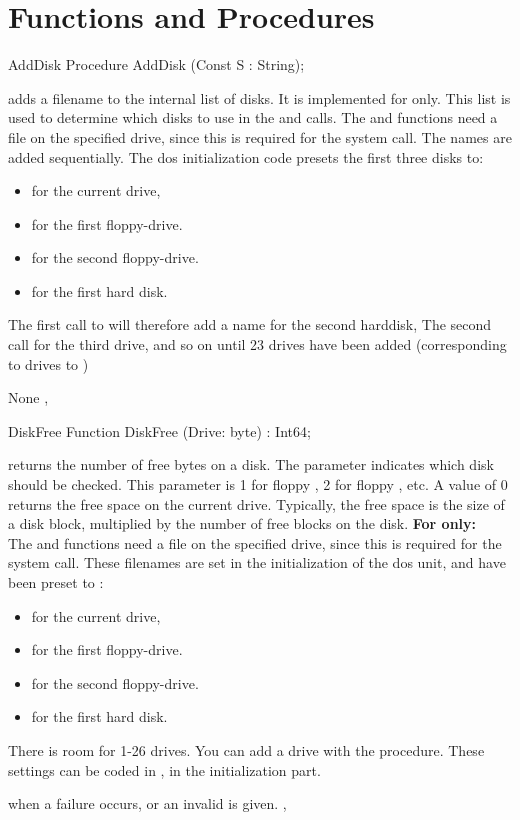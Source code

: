 \section{Functions and Procedures}
\begin{procedure}{AddDisk}
\Declaration
Procedure AddDisk (Const S : String);

\Description
{} adds a filename  to the internal list of disks. It is
implemented for \linux only.
 This list is used to determine which disks to use in the 
and  calls. 
The  and  functions need a file on the 
specified drive, since this is required for the  system call.
The names are added sequentially. The dos
initialization code presets the first three disks to:
\begin{itemize}
\item {} for the current drive, 
\item {} for the first floppy-drive.
\item {} for the second floppy-drive.
\item {} for the first hard disk.
\end{itemize}
The first call to  will therefore add a name for the second
harddisk, The second call for the third drive, and so on until 23 drives
have been added (corresponding to drives  to )

\Errors
None
\SeeAlso
{},  
\end{procedure}
\begin{function}{DiskFree}
\Declaration
Function DiskFree (Drive: byte) : Int64;

\Description

 returns the number of free bytes on a disk. The parameter
 indicates which disk should be checked. This parameter is 1 for
floppy , 2 for floppy , etc. A value of 0 returns the free
space on the current drive. 
Typically, the free space is the size of a disk block, multiplied by the
number of free blocks on the disk.
\textbf{For \linux only:}\\
The  and  functions need a file on the 
specified drive, since this is required for the  system call.
These filenames are set in the initialization of the dos unit, and have 
been preset to :
\begin{itemize}
\item {} for the current drive, 
\item {} for the first floppy-drive.
\item {} for the second floppy-drive.
\item {} for the first hard disk.
\end{itemize}
There is room for 1-26 drives. You can add a drive with the
 procedure.
These settings can be coded in , in the initialization part.

 when a failure occurs, or an invalid  is given.
\SeeAlso
{}, 
\end{function}

